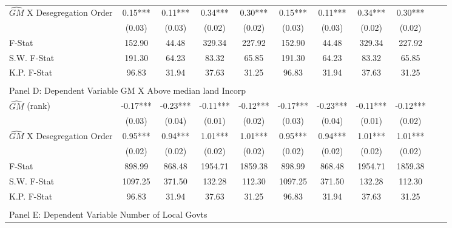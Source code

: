 \begin{table}[htbp]
\begin{threeparttable}
\begin{tabular}{l*{10}{c}}
\addlinespace
$\hat{GM}$ X Desegregation Order&       0.15***&       0.11***&       0.34***&       0.30***&       0.15***&       0.11***&       0.34***&       0.30***\\
                &     (0.03)   &     (0.03)   &     (0.02)   &     (0.02)   &     (0.03)   &     (0.03)   &     (0.02)   &     (0.02)   \\
\midrule
F-Stat          &     152.90   &      44.48   &     329.34   &     227.92   &     152.90   &      44.48   &     329.34   &     227.92   \\
S.W. F-Stat     &     191.30   &      64.23   &      83.32   &      65.85   &     191.30   &      64.23   &      83.32   &      65.85   \\
K.P. F-Stat     &      96.83   &      31.94   &      37.63   &      31.25   &      96.83   &      31.94   &      37.63   &      31.25   \\
\cmidrule[\heavyrulewidth](lr){1-9} \\ \cmidrule[\heavyrulewidth](lr){1-9}
\multicolumn{8}{l}{Panel D: Dependent Variable GM X Above median land Incorp}\\
\cmidrule(lr){1-9}
$\hat{GM}$ (rank)&      -0.17***&      -0.23***&      -0.11***&      -0.12***&      -0.17***&      -0.23***&      -0.11***&      -0.12***\\
                &     (0.03)   &     (0.04)   &     (0.01)   &     (0.02)   &     (0.03)   &     (0.04)   &     (0.01)   &     (0.02)   \\
\addlinespace
$\hat{GM}$ X Desegregation Order&       0.95***&       0.94***&       1.01***&       1.01***&       0.95***&       0.94***&       1.01***&       1.01***\\
                &     (0.02)   &     (0.02)   &     (0.02)   &     (0.02)   &     (0.02)   &     (0.02)   &     (0.02)   &     (0.02)   \\
\midrule
F-Stat          &     898.99   &     868.48   &    1954.71   &    1859.38   &     898.99   &     868.48   &    1954.71   &    1859.38   \\
S.W. F-Stat     &    1097.25   &     371.50   &     132.28   &     112.30   &    1097.25   &     371.50   &     132.28   &     112.30   \\
K.P. F-Stat     &      96.83   &      31.94   &      37.63   &      31.25   &      96.83   &      31.94   &      37.63   &      31.25   \\
\cmidrule[\heavyrulewidth](lr){1-9} \\ \cmidrule[\heavyrulewidth](lr){1-9}
\multicolumn{8}{l}{Panel E: Dependent Variable Number of Local Govts}\\

\end{tabular}
\end{threeparttable}
\end{table}
